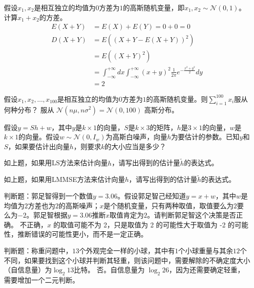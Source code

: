 \begin{problem}
	假设$x_1,x_2$是相互独立的均值为$0$方差为$1$的高斯随机变量，即$x_1,x_2\sim \mathcal{N}(0,1)$。计算$x_1+x_2$的方差。
	\solution \begin{align*}
		E(X + Y) &= E(X) + E(Y) = 0 + 0 = 0\\
		D(X + Y) &= E((X + Y - E(X + Y))^2)\\
		&=E((X + Y)^2)\\
		&=\int_{-\infty}^{+\infty}dx \int_{-\infty}^{+\infty} (x + y)^2\frac{1}{2\pi}e^{-\frac{x^2 + y^2}{2}}dy\\
		&=2
	\end{align*}
\end{problem}

\begin{problem}
	假设$x_1,x_2,\ldots,x_{100}$是相互独立的均值为$0$方差为$1$的高斯随机变量。则$\sum_{i=1}^{100}x_i$服从何种分布？
	\solution 服从 $\mathcal{N}(n\mu, n\sigma^2) = \mathcal{N}(0, 100)$ 高斯分布。
\end{problem}

\begin{problem}[\todo]
	假设$y=Sh+w$，其中$y$是$k\times 1$的向量，$S$是$k\times 3$的矩阵，$h$是$3\times 1$的向量，$w$是$k\times 1$的向量。假设$w\sim\mathcal{N}(0,I_w)$为高斯白噪声，向量$h$为要估计的参数。已知$y$和$S$，如果要估计出向量$h$，则要求$k$的大小应当是多少？
	\solution 
\end{problem}

\begin{problem}[\todo]
	如上题，如果用LS方法来估计向量$h$，请写出得到的估计量$\tilde{h}$的表达式。
	\solution 
\end{problem}

\begin{problem}[\todo]
	如上题，如果用LMMSE方法来估计向量$h$，请写出得到的估计量$\tilde{h}$的表达式。
	\solution 
\end{problem}

\begin{problem}
	判断题：郭足智得到一个数值$y=3.06$。假设郭足智己经知道$y=x+w$，其中$w$是均值为$2$方差也为$2$的高斯噪声；$x$是个随机变量，只有两种取值，取值要么为$2$要么为$-2$。郭足智根据$y=3.06$推断$x$取值肯定为$2$。请判断郭足智这个决策是否正确。
	\solution 不正确，$x$ 的取值可能不为 2，只是取值为 2 的可能性大于取值为 -2 的可能性，推断错误的可能性更小，而不是一定正确。
\end{problem}

\begin{problem}
	判断题：称重问题中，$13$个外观完全一样的小球，其中有$1$个小球重量与其余$12$个不同，如果要找到这个小球并判断其轻重，则该问题中，需要解除的不确定度大小（自信息量）为$\log_2 13$比特。
	\solution 否。自信息量为 $\log_2 26$，因为还需要确定轻重，需要增加一个二元判断。
\end{problem}

